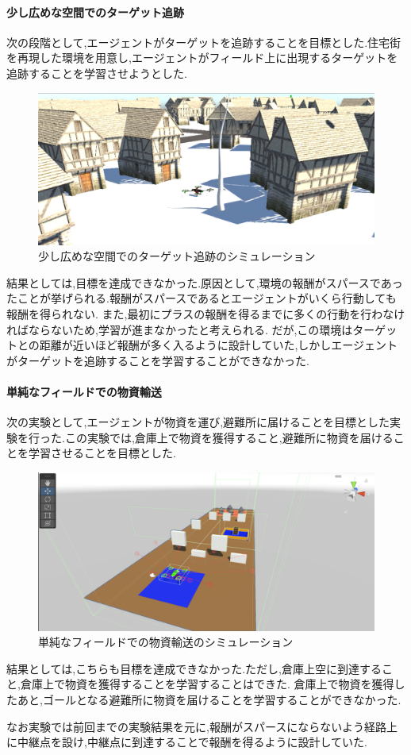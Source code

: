 \documentclass{article}[jsarticle]
\begin{document}
\paragraph{少し広めな空間でのターゲット追跡}
次の段階として,エージェントがターゲットを追跡することを目標とした.住宅街を再現した環境を用意し,エージェントがフィールド上に出現するターゲットを追跡することを学習させようとした.
\begin{figure}[H]
    \centering
    \includegraphics[width=\textwidth]{./Images/20240203220046.png}
    \captionsetup{justification=centering}
    \caption{少し広めな空間でのターゲット追跡のシミュレーション}
\end{figure}
結果としては,目標を達成できなかった.原因として,環境の報酬がスパースであったことが挙げられる.報酬がスパースであるとエージェントがいくら行動しても報酬を得られない.
また,最初にプラスの報酬を得るまでに多くの行動を行わなければならないため,学習が進まなかったと考えられる.
だが,この環境はターゲットとの距離が近いほど報酬が多く入るように設計していた,しかしエージェントがターゲットを追跡することを学習することができなかった.
\paragraph{単純なフィールドでの物資輸送}
次の実験として,エージェントが物資を運び,避難所に届けることを目標とした実験を行った.この実験では,倉庫上で物資を獲得すること,避難所に物資を届けることを学習させることを目標とした.
\begin{figure}[H]
    \centering
    \includegraphics[width=\textwidth]{./Images/202402032208.png}
    \captionsetup{justification=centering}
    \caption{単純なフィールドでの物資輸送のシミュレーション}
\end{figure}
結果としては,こちらも目標を達成できなかった.ただし,倉庫上空に到達すること,倉庫上で物資を獲得することを学習することはできた.
倉庫上で物資を獲得したあと,ゴールとなる避難所に物資を届けることを学習することができなかった.\par 
なお実験では前回までの実験結果を元に,報酬がスパースにならないよう経路上に中継点を設け,中継点に到達することで報酬を得るように設計していた.
\end{document}
